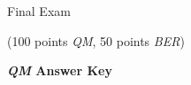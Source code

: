 \documentclass{article}
\begin{document}
\begin{comment}

\vspace*{-3cm}

\begin{flushright}
Name: \hspace*{1in}

\medskip
Student Number: \hspace*{1in}
\end{flushright}

\bigskip

\end{comment}

\begin{center}
\Large Final Exam \begin{EXAM} (100 points \emph{QM}, 50 points \emph{BER})\end{EXAM} \begin{KEY}\textbf{\emph{QM} Answer Key}\end{KEY}
\end{center}
\normalsize
\bigskip
\end{document}
